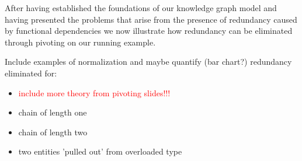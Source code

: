 \documentclass[sigconf]{acmart}
\begin{document}
After having established the foundations of our knowledge graph model and having presented the problems that arise from the presence of redundancy caused by functional dependencies we now illustrate how redundancy can be eliminated through pivoting on our running example.

Include examples of normalization and maybe quantify (bar chart?) redundancy eliminated for:
\begin{itemize}
    \item \textcolor{red}{include more theory from pivoting slides!!!}
    \item chain of length one
    \item chain of length two   
    \item two entities 'pulled out' from overloaded type
\end{itemize}
\end{document}
